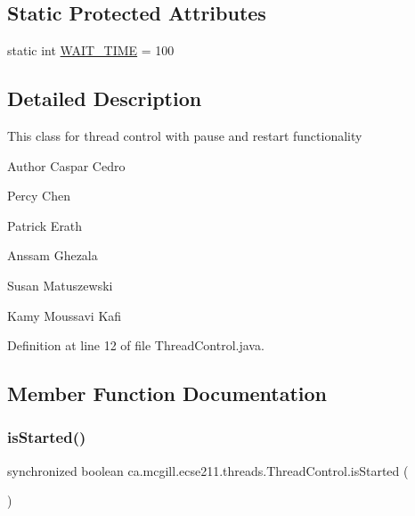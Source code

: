 \subsection*{Static Protected Attributes}
\begin{DoxyCompactItemize}
\item 
static int \hyperlink{classca_1_1mcgill_1_1ecse211_1_1threads_1_1_thread_control_a395cfe1d73b3ef14da0830ed0a499f82}{W\+A\+I\+T\+\_\+\+T\+I\+ME} = 100
\end{DoxyCompactItemize}


\subsection{Detailed Description}
This class for thread control with pause and restart functionality \begin{DoxyAuthor}{Author}
Caspar Cedro 

Percy Chen 

Patrick Erath 

Anssam Ghezala 

Susan Matuszewski 

Kamy Moussavi Kafi 
\end{DoxyAuthor}


Definition at line 12 of file Thread\+Control.\+java.



\subsection{Member Function Documentation}
\mbox{\label{classca_1_1mcgill_1_1ecse211_1_1threads_1_1_thread_control_a92f4933511db42476e39956246bcf2fe}} 
\subsubsection{\texorpdfstring{is\+Started()}{isStarted()}}
{\footnotesize\ttfamily synchronized boolean ca.\+mcgill.\+ecse211.\+threads.\+Thread\+Control.\+is\+Started (\begin{DoxyParamCaption}{ }\end{DoxyParamCaption})}


